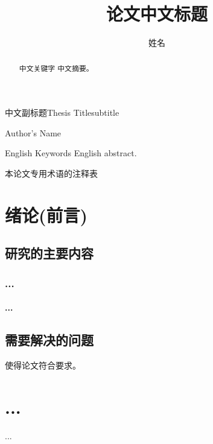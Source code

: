 \documentclass[unicode,bachelor]{seuthesis} %
\begin{document}
\title{论文中文标题}{中文副标题}{Thesis Title}{subtitle}
\author{姓\quad{}名}{Author's Name}
\address{河海院2楼}
\maketitle

\begin{abstract}{中文关键字}
  中文摘要。
\end{abstract}

\begin{englishabstract}{English Keywords}
  English abstract.
\end{englishabstract}

\begin{terminology}
  本论文专用术语的注释表
\end{terminology}

\begin{Main} %

\chapter{绪论(前言)}
\section{研究的主要内容}
\subsection{...}
\subsubsection{...}
\section{需要解决的问题}
使得论文符合要求\cite{seugs:standard}。

\chapter{...}
...

\end{Main} %
\end{document}
